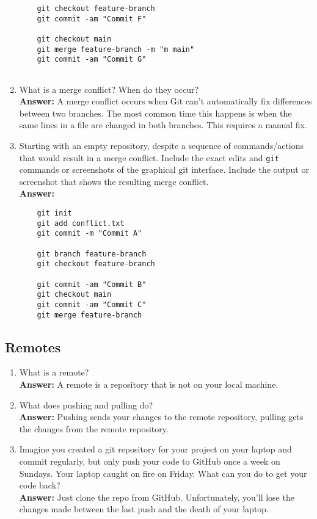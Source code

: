 \documentclass[10pt,twocolumn]{article}
\begin{document}
\begin{enumerate}
    \begin{verbatim}
    git checkout feature-branch
    git commit -am "Commit F"
    
    git checkout main
    git merge feature-branch -m "m main"
    git commit -am "Commit G"
      

    \end{verbatim}

\item What is a merge conflict? When do they occur?\\
    \textbf{Answer:}
    A merge conflict occurs when Git can't automatically fix differences between two branches. The most common time this happens is when the same lines in a file are changed in both branches. This requires a manual fix.

\item Starting with an empty repository, despite a sequence of commands/actions that would result in a merge conflict. Include the exact edits and \texttt{git} commands or screenshots of the graphical git interface. Include the output or screenshot that shows the resulting merge conflict.\\
    \textbf{Answer:}
    \begin{verbatim}
    git init 
    git add conflict.txt 
    git commit -m "Commit A"

    git branch feature-branch 
    git checkout feature-branch 

    git commit -am "Commit B"
    git checkout main 
    git commit -am "Commit C"
    git merge feature-branch 
    \end{verbatim}

\end{enumerate}

\subsection{Remotes}

\begin{enumerate}
\item What is a remote?\\
    \textbf{Answer:}
    A remote is a repository that is not on your local machine.

\item What does pushing and pulling do?\\
    \textbf{Answer:}
    Pushing sends your changes to the remote repository, pulling gets the changes from the remote repository.

\item Imagine you created a git repository for your project on your laptop and commit regularly, but only push your code to GitHub once a week on Sundays. Your laptop caught on fire on Friday. What can you do to get your code back?\\
    \textbf{Answer:}
    Just clone the repo from GitHub. Unfortunately, you'll lose the changes made between the last push and the death of your laptop.

\end{enumerate}
\end{document}
